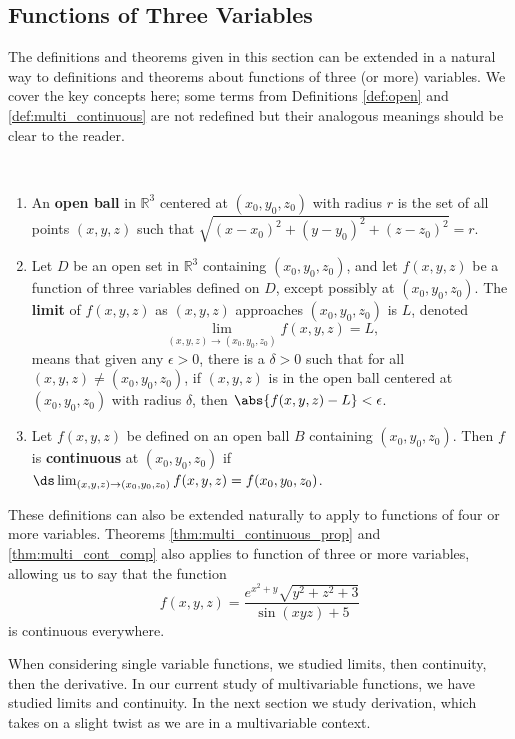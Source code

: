\subsection{Functions of Three Variables}

The definitions and theorems given in this section can be extended in a natural way to definitions and theorems about functions of three (or more) variables. We cover the key concepts here; some terms from Definitions \ref{def:open} and \ref{def:multi_continuous} are not redefined but their analogous meanings should be clear to the reader.

{%
\begin{definition}\label{def:multi3defs}%
%
\mbox{}\\[-1.5\baselineskip]\parbox[t]{\linewidth}{%
\begin{enumerate}
\item An \textbf{open ball} in $\mathbb{R}^3$ centered at $(x_0,y_0,z_0)$ with radius $r$ is the set of all points $(x,y,z)$ such that $\sqrt{(x-x_0)^2+(y-y_0)^2+(z-z_0)^2} = r$.\bigskip
\item Let $D$ be an open set in $\mathbb{R}^3$ containing $(x_0,y_0,z_0)$, and let $f(x,y,z)$ be a function of three variables defined on $D$, except possibly at  $(x_0,y_0,z_0)$. The \textbf{limit} of $f(x,y,z)$ as $(x,y,z)$ approaches $(x_0,y_0,z_0)$ is $L$, denoted 
\[\lim_{(x,y,z)\to (x_0,y_0,z_0)} f(x,y,z) = L,\]
means that given any $\epsilon >0$, there is a $\delta >0$ such that for all  $(x,y,z)\neq(x_0,y_0,z_0)$, if $(x,y,z)$ is in the open ball centered at $(x_0,y_0,z_0)$ with radius $\delta$, then $\abs{f(x,y,z) - L}< \epsilon$.\bigskip
\item Let $f(x,y,z)$ be defined on an open ball $B$ containing $(x_0,y_0,z_0)$. Then $f$ is \textbf{continuous} at $(x_0,y_0,z_0)$ if $\ds \lim_{(x,y,z)\to (x_0,y_0,z_0)} f(x,y,z) = f(x_0,y_0,z_0)$.
\end{enumerate}}
\end{definition}}

These definitions can also be extended naturally to apply to functions of four or more variables. Theorems \ref{thm:multi_continuous_prop} and \ref{thm:multi_cont_comp} also applies to function of three or more variables, allowing us to say that the function
\[f(x,y,z) = \frac{e^{x^2+y}\sqrt{y^2+z^2+3}}{\sin (xyz)+5}\]
is continuous everywhere.

When considering single variable functions, we studied limits, then continuity, then the derivative. In our current study of multivariable functions, we have studied limits and continuity. In the next section we study derivation, which takes on a slight twist as we are in a multivariable context.

